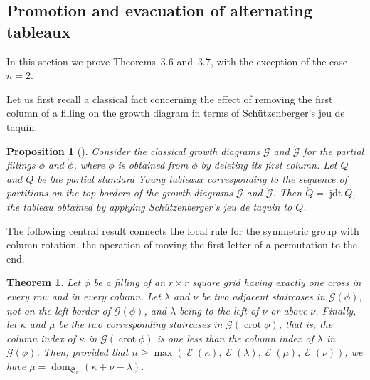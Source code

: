 \documentclass[10pt]{article}
\newtheorem{theo}[theorem]{Theorem}
\newtheorem{prop}[theorem]{Proposition}
\theoremstyle{definition}
\newcommand{\fS}{\mathfrak{S}}
\DeclareMathOperator{\dom}{dom} %
\DeclareMathOperator{\jdt}{jdt} %
\DeclareMathOperator{\crot}{crot} %
\DeclareMathOperator{\extent}{\mathcal{E}} %
\newcommand{\Grm}{\mathcal{G}} %
\newcommand{\half}[1]{\acute{#1}} %
\begin{document}
\subsection{Promotion and evacuation of alternating tableaux}
\label{sec:alternating}
In this section we prove Theorems~3.6
and~3.7, with the exception of
the case $n=2$.

Let us first recall a classical fact concerning the effect of
removing the first column of a filling on the growth diagram in terms
of Schützenberger's jeu de taquin.
\begin{prop}[]
 \label{prop:jdt-delete-column}
 Consider the classical growth diagrams $\Grm$ and $\half\Grm$ for the
 partial fillings $\phi$ and $\half\phi$, where $\half\phi$ is
 obtained from $\phi$ by deleting its first column. Let $Q$ and
 $\half Q$
 be the partial standard Young tableaux corresponding to the
 sequence of partitions on the top borders
 of the growth diagrams $\Grm$ and $\half\Grm$. Then
 $\half Q = \jdt Q$, the tableau obtained by applying
 Schützenberger's jeu de taquin to $Q$.
%
%
%
%
%
%
%
\end{prop}

The following central result connects the local rule for the symmetric group with column rotation, the operation of moving the first letter of a permutation to the end.
\begin{theo}\label{thm:growth-diagram-rotation}
 Let $\phi$ be a filling of an $r\times r$ square grid having
 exactly one cross in every row and in every column. Let $\lambda$
 and $\nu$ be two adjacent staircases in $\Grm(\phi)$, not on the left
 border of $\Grm(\phi)$, and $\lambda$ being to the left of $\nu$ or
 above $\nu$. Finally, let $\kappa$ and $\mu$ be the two
 corresponding staircases in $\Grm(\crot\phi)$, that is, the column
 index of $\kappa$ in $\Grm(\crot\phi)$ is one less than the column
 index of $\lambda$ in $\Grm(\phi)$. Then, provided that
 $n\geq\max(\extent(\kappa),\extent(\lambda),\extent(\mu),\extent(\nu))$,
 we have $\mu = \dom_{\fS_n}(\kappa+\nu-\lambda)$.
\end{theo}
\end{document}
